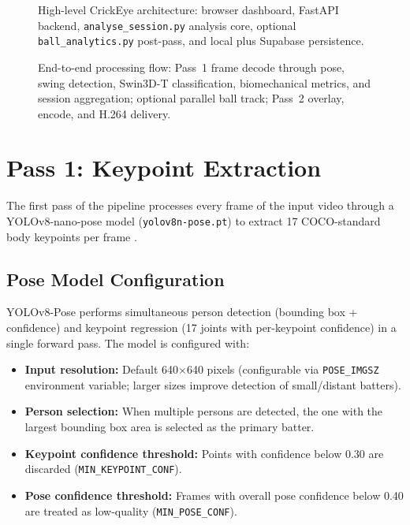 \begin{justify}
\begin{figure}[htbp]
\centering

\caption[Fig.~F1 --- system architecture]{High-level CrickEye architecture: browser dashboard, FastAPI backend, \texttt{analyse\_session.py} analysis core, optional \texttt{ball\_analytics.py} post-pass, and local plus Supabase persistence.}
\label{fig:architecture}
\end{figure}

\begin{figure}[htbp]
\centering

\caption[Fig.~F2 --- pipeline flow]{End-to-end processing flow: Pass~1 frame decode through pose, swing detection, Swin3D-T classification, biomechanical metrics, and session aggregation; optional parallel ball track; Pass~2 overlay, encode, and H.264 delivery.}
\label{fig:pipeline}
\end{figure}

\section{Pass 1: Keypoint Extraction}

\par The first pass of the pipeline processes every frame of the input video through a YOLOv8-nano-pose model (\texttt{yolov8n-pose.pt}) \cite{YOLOv8} to extract 17 COCO-standard body keypoints per frame \cite{Lin2014MicrosoftCOCO}.

\subsection{Pose Model Configuration}

\par YOLOv8-Pose performs simultaneous person detection (bounding box + confidence) and keypoint regression (17 joints with per-keypoint confidence) in a single forward pass. The model is configured with:

\begin{itemize}
    \item \textbf{Input resolution:} Default 640$\times$640 pixels (configurable via \texttt{POSE\_IMGSZ} environment variable; larger sizes improve detection of small/distant batters).
    \item \textbf{Person selection:} When multiple persons are detected, the one with the largest bounding box area is selected as the primary batter.
    \item \textbf{Keypoint confidence threshold:} Points with confidence below 0.30 are discarded (\texttt{MIN\_KEYPOINT\_CONF}).
    \item \textbf{Pose confidence threshold:} Frames with overall pose confidence below 0.40 are treated as low-quality (\texttt{MIN\_POSE\_CONF}).
\end{itemize}


\end{justify}
